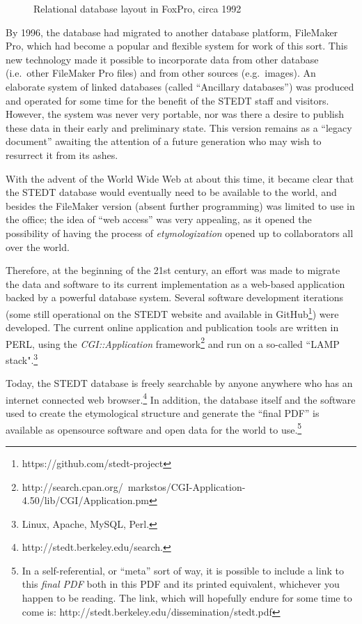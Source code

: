 \begin{figure}[ht]
\centering
{}
\caption{Relational database layout in FoxPro, circa 1992}
\label{fig:foxpro}
\end{figure}


By 1996, the database had migrated to another database platform,
FileMaker Pro\texttrademark, which had become a popular and flexible system for work
of this sort.   This new technology made it possible to incorporate
data from other database (i.e.\ other FileMaker Pro files) and from other
sources (e.g.\ images). An elaborate system of linked databases (called
``Ancillary databases'') was produced and operated for some time for
the benefit of the STEDT staff and visitors. However, the system was
never very portable, nor was there a desire to publish these data in
their early and preliminary state. This version remains as a ``legacy
document'' awaiting the attention of a future generation who may wish
to resurrect it from its ashes.

With the advent of the World Wide Web at about this time, it became clear that
the STEDT database would eventually need to be available to the world,
and besides the FileMaker version (absent further programming) was
limited to use in the office; the idea of ``web access'' was very
appealing, as it opened the possibility of having the process of {\it etymologization}
opened up to collaborators all over the world.

Therefore, at the beginning of the 21st century, an effort was made to
migrate the data and software to its current implementation as a
web-based application backed by a powerful database system.  Several
software development iterations (some still operational on the STEDT
website and available in GitHub\footnote{https://github.com/stedt-project}) were developed.   
The current online application and publication tools are written in
PERL, using the {\it CGI::Application} framework\footnote{http://search.cpan.org/~markstos/CGI-Application-4.50/lib/CGI/Application.pm}
and run on a so-called ``LAMP stack".\footnote{Linux, Apache, MySQL, Perl.}

Today, the STEDT database is freely searchable by anyone anywhere who has
an internet connected web browser.\footnote{http://stedt.berkeley.edu/search.}
In addition, the database itself and
the software used to create the etymological structure and generate
the ``final PDF'' is available as opensource software and open data for the world to
use.\footnote{In a self-referential, or ``meta'' sort of way, it is
  possible to include a link to this {\it final PDF} both in this PDF and
  its printed equivalent, whichever you happen to be reading. The
  link, which will hopefully endure for some time to come is: http://stedt.berkeley.edu/dissemination/stedt.pdf}


